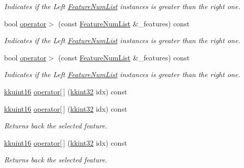 \begin{DoxyCompactItemize}
\begin{DoxyCompactList}\small\item\em Indicates if the Left \hyperlink{class_k_k_m_l_l_1_1_feature_num_list}{Feature\+Num\+List} instances is greater than the right one. \end{DoxyCompactList}\item 
bool \hyperlink{class_k_k_m_l_l_1_1_feature_num_list_a7befff9816304c7ec1ca49ecfa36c109}{operator$>$} (const \hyperlink{class_k_k_m_l_l_1_1_feature_num_list}{Feature\+Num\+List} \&\+\_\+features) const 
\begin{DoxyCompactList}\small\item\em Indicates if the Left \hyperlink{class_k_k_m_l_l_1_1_feature_num_list}{Feature\+Num\+List} instances is greater than the right one. \end{DoxyCompactList}\item 
bool \hyperlink{class_k_k_m_l_l_1_1_feature_num_list_a7befff9816304c7ec1ca49ecfa36c109}{operator$>$} (const \hyperlink{class_k_k_m_l_l_1_1_feature_num_list}{Feature\+Num\+List} \&\+\_\+features) const 
\begin{DoxyCompactList}\small\item\em Indicates if the Left \hyperlink{class_k_k_m_l_l_1_1_feature_num_list}{Feature\+Num\+List} instances is greater than the right one. \end{DoxyCompactList}\item 
\hyperlink{namespace_k_k_b_aa8c7d4d30381c8a0b6fce68974a9c8a9}{kkuint16} \hyperlink{class_k_k_m_l_l_1_1_feature_num_list_a38bc1ef97189c1f544d64180d47798fe}{operator\mbox{[}$\,$\mbox{]}} (\hyperlink{namespace_k_k_b_a8fa4952cc84fda1de4bec1fbdd8d5b1b}{kkint32} idx) const 
\item 
\hyperlink{namespace_k_k_b_aa8c7d4d30381c8a0b6fce68974a9c8a9}{kkuint16} \hyperlink{class_k_k_m_l_l_1_1_feature_num_list_ad9ad2eb84644439cad3be285af233ec6}{operator\mbox{[}$\,$\mbox{]}} (\hyperlink{namespace_k_k_b_a8fa4952cc84fda1de4bec1fbdd8d5b1b}{kkint32} idx) const 
\begin{DoxyCompactList}\small\item\em Returns back the selected feature. \end{DoxyCompactList}\item 
\hyperlink{namespace_k_k_b_aa8c7d4d30381c8a0b6fce68974a9c8a9}{kkuint16} \hyperlink{class_k_k_m_l_l_1_1_feature_num_list_ad9ad2eb84644439cad3be285af233ec6}{operator\mbox{[}$\,$\mbox{]}} (\hyperlink{namespace_k_k_b_a8fa4952cc84fda1de4bec1fbdd8d5b1b}{kkint32} idx) const 
\begin{DoxyCompactList}\small\item\em Returns back the selected feature. \end{DoxyCompactList}\item 

\end{DoxyCompactItemize}

